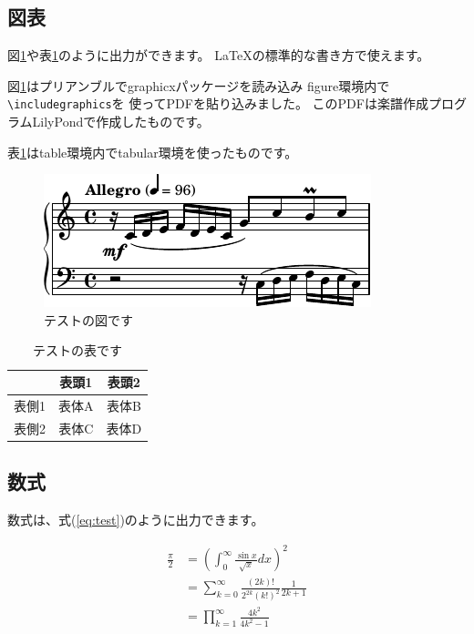 \documentclass{FITpaper}
\begin{document}
\subsection{図表}

図\ref{fig:test}や表\ref{tbl:test}のように出力ができます。
\LaTeX の標準的な書き方で使えます。

図\ref{fig:test}はプリアンブルでgraphicxパッケージを読み込み
figure環境内で\texttt{\textbackslash includegraphics}を
使ってPDFを貼り込みました。
このPDFは楽譜作成プログラムLilyPond\cite{lilypond}で作成したものです。

表\ref{tbl:test}はtable環境内でtabular環境を使ったものです。

\begin{figure}
  \centering
  \includegraphics{invention1}
  \caption{テストの図です}
  \label{fig:test}
\end{figure}

\begin{table}
  \centering
  \begin{tabular}{c|cc}
    & 表頭1 & 表頭2 \\
    \hline
    表側1 & 表体A & 表体B \\
    表側2 & 表体C & 表体D \\
  \end{tabular}
  \caption{テストの表です}
  \label{tbl:test}
\end{table}

\subsection{数式}

数式は、式(\ref{eq:test})のように出力できます。

\begin{align}
  \frac{\pi}{2} &=
  \left( \int_{0}^{\infty} \frac{\sin x}{\sqrt{x}} dx \right)^2 \nonumber \\
  &= \sum_{k=0}^{\infty} \frac{(2k)!}{2^{2k}(k!)^2} \frac{1}{2k+1} \nonumber \\
  &= \prod_{k=1}^{\infty} \frac{4k^2}{4k^2 - 1}
  \label{eq:test}
\end{align}
\end{document}
